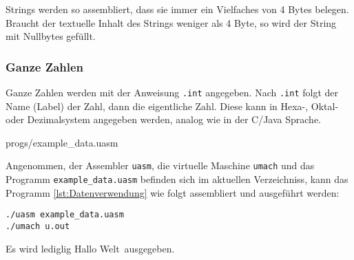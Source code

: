 Strings werden so assembliert, dass sie immer ein Vielfaches von 4 Bytes
belegen. Braucht der textuelle Inhalt des Strings weniger als 4 Byte, so wird
der String mit Nullbytes gefüllt.


\subsubsection{Ganze Zahlen}

Ganze Zahlen werden mit der Anweisung \texttt{.int} angegeben. Nach
\texttt{.int} folgt der Name (Label) der Zahl, dann die eigentliche Zahl. Diese
kann in Hexa-, Oktal- oder Dezimalsystem angegeben werden, analog wie in der
C/Java Sprache.


{progs/example_data.uasm}

Angenommen, der Assembler \texttt{uasm}, die virtuelle Maschine
\texttt{umach} und das Programm \texttt{example\_data.uasm} befinden sich im
aktuellen Verzeichniss, kann das Programm \ref{lst:Datenverwendung}  wie folgt
assembliert und ausgeführt werden:
\begin{lstlisting}
./uasm example_data.uasm
./umach u.out
\end{lstlisting}
Es wird lediglig \glqq Hallo Welt\grqq\ ausgegeben.
